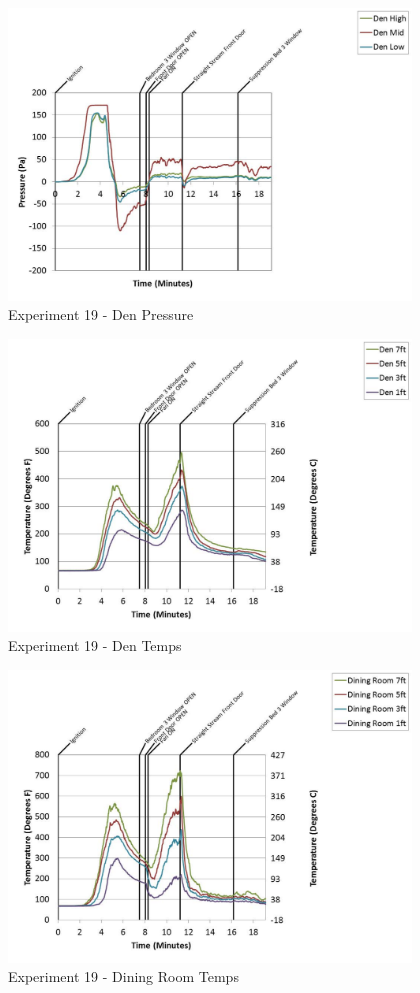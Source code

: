 \documentclass{article}
\begin{document}
\begin{appendices}
	\begin{figure}[h!]
		\centering
		\includegraphics[height=3.05in]{0_Images/Results_Charts/Exp_19_Charts/DenPressure.pdf}
		\caption{Experiment 19 - Den Pressure}
	\end{figure}
 
	\clearpage

	\begin{figure}[h!]
		\centering
		\includegraphics[height=3.05in]{0_Images/Results_Charts/Exp_19_Charts/DenTemps.pdf}
		\caption{Experiment 19 - Den Temps}
	\end{figure}
 

	\begin{figure}[h!]
		\centering
		\includegraphics[height=3.05in]{0_Images/Results_Charts/Exp_19_Charts/DiningRoomTemps.pdf}
		\caption{Experiment 19 - Dining Room Temps}
	\end{figure}
 

\end{appendices}
\end{document}
